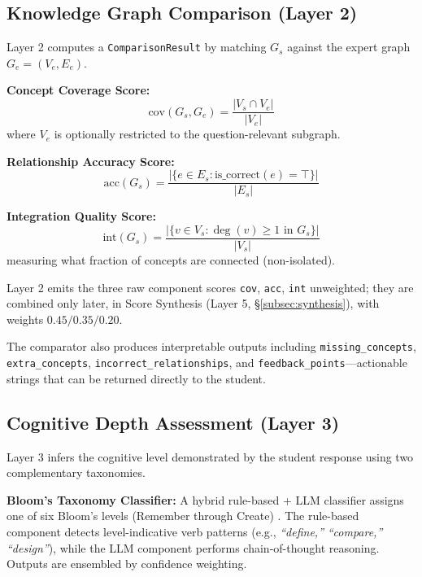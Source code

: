 \documentclass[conference]{IEEEtran}
\begin{document}
\subsection{Knowledge Graph Comparison (Layer 2)}
\label{subsec:comparison}

Layer 2 computes a \texttt{ComparisonResult} by matching $G_s$ against the expert
graph $G_e = (V_e, E_e)$.

\textbf{Concept Coverage Score:}
\begin{equation}
  \text{cov}(G_s, G_e) = \frac{|V_s \cap V_e|}{|V_e|}
  \label{eq:coverage}
\end{equation}
where $V_e$ is optionally restricted to the question-relevant subgraph.

\textbf{Relationship Accuracy Score:}
\begin{equation}
  \text{acc}(G_s) = \frac{|\{e \in E_s : \text{is\_correct}(e) = \top\}|}{|E_s|}
  \label{eq:accuracy}
\end{equation}

\textbf{Integration Quality Score:}
\begin{equation}
  \text{int}(G_s) = \frac{|\{v \in V_s : \deg(v) \geq 1 \text{ in } G_s\}|}{|V_s|}
  \label{eq:integration}
\end{equation}
measuring what fraction of concepts are connected (non-isolated).

Layer 2 emits the three raw component scores \texttt{cov}, \texttt{acc},
\texttt{int} unweighted; they are combined only later, in Score Synthesis
(Layer 5, \S\ref{subsec:synthesis}), with weights $0.45/0.35/0.20$.

The comparator also produces interpretable outputs including \texttt{missing\_concepts},
\texttt{extra\_concepts}, \texttt{incorrect\_relationships}, and
\texttt{feedback\_points}—actionable strings that can be returned directly to
the student.

\subsection{Cognitive Depth Assessment (Layer 3)}

Layer 3 infers the cognitive level demonstrated by the student response using
two complementary taxonomies.

\textbf{Bloom's Taxonomy Classifier:} A hybrid rule-based + LLM classifier
assigns one of six Bloom's levels (Remember through Create)
\cite{bloom1956,anderson2001}. The rule-based component detects level-indicative
verb patterns (e.g., \emph{``define,''} \emph{``compare,''} \emph{``design''}),
while the LLM component performs chain-of-thought reasoning. Outputs are ensembled
by confidence weighting.
\end{document}
